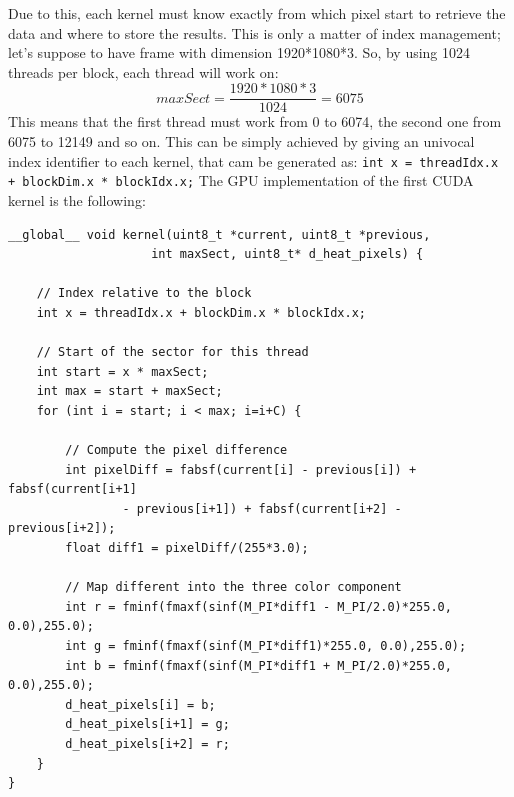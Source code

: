 \documentclass[paper=a4, fontsize=10pt]{scrartcl}	%
\begin{document}
	Due to this, each kernel must know exactly from which pixel start to retrieve the data and where to store the results. This is only a matter of index management; let's suppose to have frame with dimension 1920*1080*3. So, by using 1024 threads per block, each thread will work on:
	\[
		maxSect = \frac{1920*1080*3}{1024} = 6075
	\]
	This means that the first thread must work from 0 to 6074, the second one from 6075 to 12149 and so on. This can be simply achieved by giving an univocal index identifier to each kernel, that cam be generated as:\newline\newline
	\texttt{int x = threadIdx.x + blockDim.x * blockIdx.x;}\newline\newline
	The GPU implementation of the first CUDA kernel is the following:
	\begin{lstlisting}[style=CStyle]
__global__ void kernel(uint8_t *current, uint8_t *previous,
					int maxSect, uint8_t* d_heat_pixels) {
	
	// Index relative to the block					
	int x = threadIdx.x + blockDim.x * blockIdx.x;
	
	// Start of the sector for this thread
	int start = x * maxSect;
	int max = start + maxSect;
	for (int i = start; i < max; i=i+C) {
		
		// Compute the pixel difference
		int pixelDiff = fabsf(current[i] - previous[i]) + fabsf(current[i+1]
				- previous[i+1]) + fabsf(current[i+2] - previous[i+2]); 
		float diff1 = pixelDiff/(255*3.0);
		
		// Map different into the three color component
		int r = fminf(fmaxf(sinf(M_PI*diff1 - M_PI/2.0)*255.0, 0.0),255.0);
		int g = fminf(fmaxf(sinf(M_PI*diff1)*255.0, 0.0),255.0);
		int b = fminf(fmaxf(sinf(M_PI*diff1 + M_PI/2.0)*255.0, 0.0),255.0);
		d_heat_pixels[i] = b;
		d_heat_pixels[i+1] = g;
		d_heat_pixels[i+2] = r;
	}
} \end{lstlisting}
	
\end{document}
